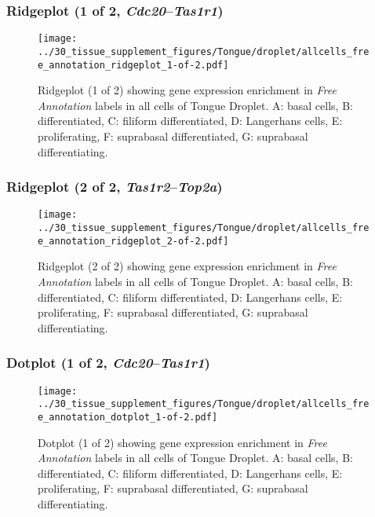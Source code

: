 \subsubsection{Ridgeplot (1 of 2, \emph{Cdc20}--\emph{Tas1r1})}
\begin{figure}[h]
\centering
\texttt{[image: ../30\_tissue\_supplement\_figures/Tongue/droplet/allcells\_free\_annotation\_ridgeplot\_1-of-2.pdf]}

\caption{ Ridgeplot (1 of 2)  showing gene expression enrichment in \emph{Free Annotation} labels in all cells of Tongue Droplet. A: basal cells, B: differentiated, C: filiform differentiated, D: Langerhans cells, E: proliferating, F: suprabasal differentiated, G: suprabasal differentiating.}
\end{figure}


\clearpage

\subsubsection{Ridgeplot (2 of 2, \emph{Tas1r2}--\emph{Top2a})}
\begin{figure}[h]
\centering
\texttt{[image: ../30\_tissue\_supplement\_figures/Tongue/droplet/allcells\_free\_annotation\_ridgeplot\_2-of-2.pdf]}

\caption{ Ridgeplot (2 of 2)  showing gene expression enrichment in \emph{Free Annotation} labels in all cells of Tongue Droplet. A: basal cells, B: differentiated, C: filiform differentiated, D: Langerhans cells, E: proliferating, F: suprabasal differentiated, G: suprabasal differentiating.}
\end{figure}


\clearpage

\subsubsection{Dotplot (1 of 2, \emph{Cdc20}--\emph{Tas1r1})}
\begin{figure}[h]
\centering
\texttt{[image: ../30\_tissue\_supplement\_figures/Tongue/droplet/allcells\_free\_annotation\_dotplot\_1-of-2.pdf]}

\caption{ Dotplot (1 of 2)  showing gene expression enrichment in \emph{Free Annotation} labels in all cells of Tongue Droplet. A: basal cells, B: differentiated, C: filiform differentiated, D: Langerhans cells, E: proliferating, F: suprabasal differentiated, G: suprabasal differentiating.}
\end{figure}


